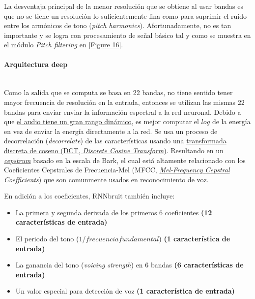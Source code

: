 \documentclass[conference,onecolumn]{IEEEtran}
\begin{document}
La desventaja principal de la menor resolución que se obtiene al usar bandas es que no se tiene un resolución lo suficientemente fina como para suprimir el ruido entre los armónicos de tono (\textit{pitch harmonics}). Afortunadamente, no es tan importante y se logra con procesamiento de señal básico tal y como se muestra en el módulo \textit{Pitch filtering} en \ref{Figure 16}.

\medskip
\paragraph{\textbf{Arquitectura deep}}
\hfill\\
Como la salida que se computa se basa en 22 bandas, no tiene sentido tener mayor frecuencia de resolución en la entrada, entonces se utilizan las mismas 22 bandas para enviar enviar la información espectral a la red neuronal. Debido a que \href{https://www.britannica.com/science/dynamic-range}{el audio tiene un gran rango dinámico}, es mejor computar el $log$ de la energía en vez de enviar la energía directamente a la red. Se usa un proceso de decorrelación (\textit{decorrelate}) de las características usando una \href{https://dsp.stackexchange.com/questions/27810/how-to-understand-the-de-correlation-property-of-dct-what-does-de-correlation-m}{transformada discreta de coseno (DCT, \textit{Discrete Cosine Transform})}. Resultando en un \href{https://es.wikipedia.org/wiki/Cepstrum}{\textit{cepstrum}} basado en la escala de Bark, el cual está altamente relacionado con los Coeficientes Cepstrales de Frecuencia-Mel (MFCC, \href{https://en.wikipedia.org/wiki/Mel-frequency_cepstrum}{\textit{Mel-Frequency Cepstral Coefficients})} que son comunmente usados en reconocimiento de voz.


En adición a los coeficientes, RNNbruit también incluye:

\begin{itemize}
    \item La primera y segunda derivada de los primeros 6 coeficientes \textbf{(12 características de entrada)}
    \item El periodo del tono ($1$/$frecuencia fundamental$) \textbf{(1 característica de entrada)}
    \item La ganancia del tono (\textit{voicing strength}) en 6 bandas \textbf{(6 características de entrada)}
    \item Un valor especial para detección de voz \textbf{(1 característica de entrada)}
\end{itemize}
\end{document}
